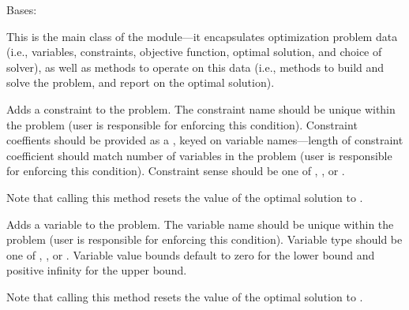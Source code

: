 \documentclass[letterpaper,10pt,english]{sphinxmanual}
\begin{document}

\begin{fulllineitems}
\label{\detokenize{opt:opt.Problem}}
Bases: 

This is the main class of the  module—it encapsulates optimization problem data (i.e., variables, constraints, objective function, optimal solution, and choice of solver), as well as methods to operate on this data (i.e., methods to build and solve the problem, and report on the optimal solution).

\begin{fulllineitems}
\label{\detokenize{opt:opt.Problem.add_constraint}}
Adds a constraint to the problem. The constraint name should be unique within the problem (user is responsible for enforcing this condition). Constraint coeffients should be provided as a , keyed on variable names—length of constraint coefficient  should match number of variables in the problem (user is responsible for enforcing this condition). Constraint sense should be one of , , or .

Note that calling this method resets the value of the optimal solution to .

\end{fulllineitems}


\begin{fulllineitems}
\label{\detokenize{opt:opt.Problem.add_var}}
Adds a variable to the problem. The variable name should be unique within the problem (user is responsible for enforcing this condition). Variable type should be one of , , or . Variable value bounds default to zero for the lower bound and positive infinity for the upper bound.

Note that calling this method resets the value of the optimal solution to .


\end{fulllineitems}
\end{fulllineitems}
\end{document}
